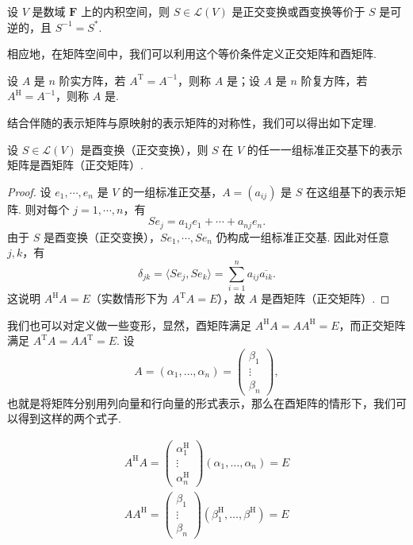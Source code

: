 \begin{theorem}{}{}
    设 $ V $ 是数域 $ \mathbf{F} $ 上的内积空间，则 $ S \in \mathcal{L}(V) $ 是正交变换或酉变换等价于 $ S $ 是可逆的，且 $ S^{-1} = S^* $.
\end{theorem}

相应地，在矩阵空间中，我们可以利用这个等价条件定义正交矩阵和酉矩阵.

\begin{definition}{}{}  
    设 $ A $ 是 $ n $ 阶实方阵，若 $ A^{\mathrm{T}} = A^{-1} $，则称 $ A $ 是；设 $ A $ 是 $ n $ 阶复方阵，若 $ A^\mathrm{H} = A^{-1} $，则称 $ A $ 是.
\end{definition}

结合伴随的表示矩阵与原映射的表示矩阵的对称性，我们可以得出如下定理.

\begin{theorem}{}{}
    设 $ S \in \mathcal{L}(V) $ 是酉变换（正交变换），则 $ S $ 在 $ V $ 的任一一组标准正交基下的表示矩阵是酉矩阵（正交矩阵）.
\end{theorem}

\begin{proof}
    设 $ e_1, \cdots, e_n $ 是 $ V $ 的一组标准正交基，$ A = (a_{ij}) $ 是 $ S $ 在这组基下的表示矩阵. 则对每个 $ j = 1, \cdots, n $，有
    \[
        S e_j = a_{1j} e_1 + \cdots + a_{nj} e_n.
    \]
    由于 $ S $ 是酉变换（正交变换），$ S e_1, \cdots, S e_n $ 仍构成一组标准正交基. 因此对任意 $ j, k $，有
    \[
        \delta_{jk} = \langle S e_j, S e_k \rangle
        = \sum_{i = 1}^n a_{ij} \overline{a_{ik}}.
    \]
    这说明 $ A^\mathrm{H} A = E $（实数情形下为 $ A^{\mathrm{T}} A = E $），故 $ A $ 是酉矩阵（正交矩阵）.
\end{proof}

我们也可以对定义做一些变形，显然，酉矩阵满足 $ A^\mathrm{H}A = AA^\mathrm{H} = E $，而正交矩阵满足 $ A^{\mathrm{T}}A = AA^{\mathrm{T}} = E $. 设 \[
    A = (\alpha_1, \ldots, \alpha_n) = \begin{pmatrix}
        \beta_1 \\
        \vdots  \\
        \beta_n
    \end{pmatrix},
\]
也就是将矩阵分别用列向量和行向量的形式表示，那么在酉矩阵的情形下，我们可以得到这样的两个式子.

\begin{gather*}
    A^{\mathrm{H}}A = \begin{pmatrix}
        \alpha_1^{\mathrm{H}} \\
        \vdots                \\
        \alpha_n^{\mathrm{H}}
    \end{pmatrix} (\alpha_1, \ldots, \alpha_n) = E \\
    AA^{\mathrm{H}} = \begin{pmatrix}
        \beta_1 \\
        \vdots  \\
        \beta_n
    \end{pmatrix} (\beta_1^{\mathrm{H}}, \ldots, \beta^{\mathrm{H}}) = E
\end{gather*}

